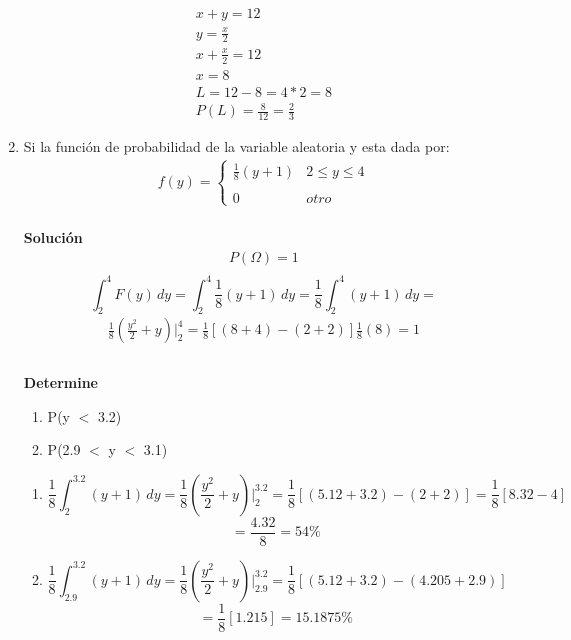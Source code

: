 \begin{enumerate}
\begin{gather*}
    x + y = 12\\
    y = \frac{x}{2}\\
    x + \frac{x}{2} = 12\\
    x = 8\\
    L = 12 - 8 = 4*2 = 8\\
    P(L)=\frac{8}{12}=\frac{2}{3}
    \end{gather*}
    \item Si la función de probabilidad de la variable aleatoria y esta dada por:
    \begin{gather*}
    f(y)= \left\{ \begin{array}{lcc}
    \frac{1}{8}(y+1) & 2 \leq y \leq 4\\
    \\ 0 & otro 
    \end{array}
    \right.
    \end{gather*}
    \\\textbf{Solución}
    \\
    \begin{gather*}
    P(\Omega)=1\\ 
    \end{gather*}
    \[ \int_{2}^{4}  \! F(y) \, dy =
    \int_{2}^{4}  \! \frac{1}{8}(y+1) \, dy =\frac{1}{8}\int_{2}^{4}  \! (y+1) \, dy = 
    \]
    \begin{gather*}
    \frac{1}{8}(\frac{y^2}{2}+y)|_2^4 =
    \frac{1}{8}[(8+4)-(2+2)]\frac{1}{8}(8)=1 \\
    \end{gather*}
    \\\textbf{Determine}\\
    \begin{enumerate}
        \item P(y $<$ 3.2)\\
        \item P(2.9 $<$ y $<$ 3.1)
    \end{enumerate}
    \begin{enumerate}
        \item  \[\frac{1}{8}\int_{2}^{3.2}  \! (y+1) \, dy =\frac{1}{8}(\frac{y^2}{2}+y)|_2^3.2 = \frac{1}{8}[(5.12+3.2)-(2+2)]=\frac{1}{8}[8.32-4]
        \]
        \[=\frac{4.32}{8}=54\% 
        \]
        \item \[\frac{1}{8}\int_{2.9}^{3.2}  \! (y+1) \, dy =\frac{1}{8}(\frac{y^2}{2}+y)|_2.9^3.2 = \frac{1}{8}[(5.12+3.2)-(4.205+2.9)]
        \]
        \[=\frac{1}{8}[1.215]=15.1875\% 
        \]
    \end{enumerate}

\end{enumerate}
